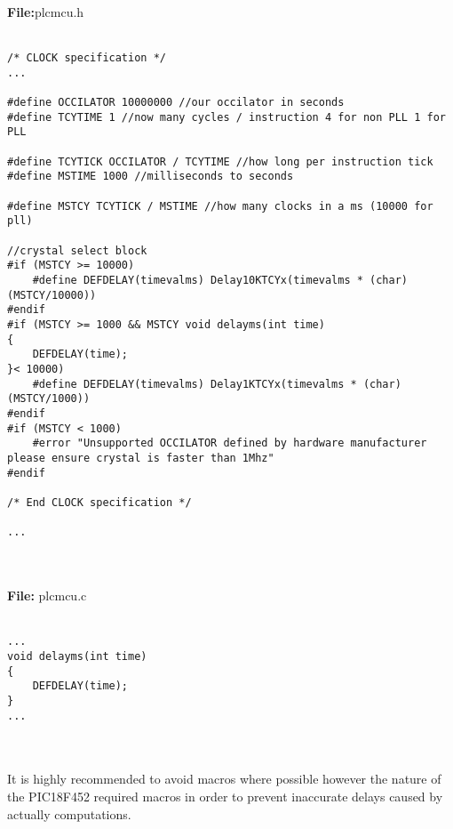 \textbf{File:}plcmcu.h
\\
\\
\begin{minipage}{\textwidth}
\begin{lstlisting}[frame=single]
/* CLOCK specification */
...

#define OCCILATOR 10000000 //our occilator in seconds
#define TCYTIME 1 //now many cycles / instruction 4 for non PLL 1 for PLL 

#define TCYTICK OCCILATOR / TCYTIME //how long per instruction tick
#define MSTIME 1000 //milliseconds to seconds

#define MSTCY TCYTICK / MSTIME //how many clocks in a ms (10000 for pll)

//crystal select block
#if (MSTCY >= 10000)
	#define DEFDELAY(timevalms) Delay10KTCYx(timevalms * (char) (MSTCY/10000))
#endif
#if (MSTCY >= 1000 && MSTCY void delayms(int time)
{
	DEFDELAY(time);
}< 10000)
	#define DEFDELAY(timevalms) Delay1KTCYx(timevalms * (char) (MSTCY/1000))
#endif
#if (MSTCY < 1000)
	#error "Unsupported OCCILATOR defined by hardware manufacturer please ensure crystal is faster than 1Mhz"
#endif

/* End CLOCK specification */

...
\end{lstlisting}
\end{minipage}
\\
\\
\textbf{File:} plcmcu.c
\\
\\
\begin{minipage}{\textwidth}
\begin{lstlisting}[frame=single]
...
void delayms(int time)
{
	DEFDELAY(time);
}
...
\end{lstlisting}
\end{minipage}
\\
\\
It is highly recommended to avoid macros where possible however the nature of the PIC18F452 required macros in order to prevent inaccurate delays caused by actually computations.